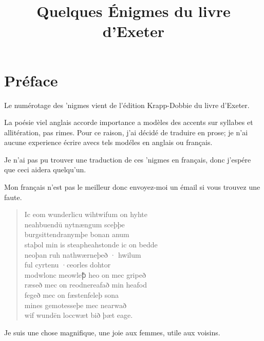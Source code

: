 \documentclass{letter}
\title{Quelques \'Enigmes du livre d'Exeter}
\newcommand{\attrib}[1]{%
\nopagebreak{\raggedleft\footnotesize #1\par}}
\begin{document}
\section{Pr\'eface}
Le num\'erotage des \e'nigmes vient de l'\'edition Krapp-Dobbie du livre d'Exeter.

La po\'esie viel anglais accorde importance a mod\`eles des accents sur syllabes et allit\'eration, pas rimes. Pour ce raison, j'ai d\'ecid\'e de traduire en prose; je n'ai aucune experience \'ecrire avecs tels mod\'eles en anglais ou fran\c{c}ais. 

Je n'ai pas pu trouver une traduction de ces \e'nigmes en fran\c{c}ais, donc j'esp\'ere que ceci aidera quelqu'un. 

Mon fran\c{c}ais n'est pas le meilleur donc envoyez-moi un \'email si vous trouvez une faute. 

\begin{verse}
Ic eom wunderlicu wiht\qquad     wifum on hyhte\\
neahbuendū nyt\qquad     nængum sceþþe\\
burgsittendra\qquad     nymþe bonan anum\\
staþol min is steapheah\qquad     stonde ic on bedde\\
neoþan ruh nathwær\qquad     neþeð · hwilum\\
ful cyrtenu ·\qquad     ceorles dohtor\\
modwlonc meowle\qquad     ꝥ heo on mec gripeð\\
ræseð mec on reodne\qquad     reafað min heafod\\
fegeð mec on fæsten\qquad     feleþ sona\\
mines gemotes\qquad     seþe mec nearwað\\
wif wundēn locc\qquad     wæt bið þæt eage.
\end{verse}
\attrib{Exter Book}

Je suis une chose magnifique,     une joie aux femmes,
utile aux voisins. 
\end{document}
